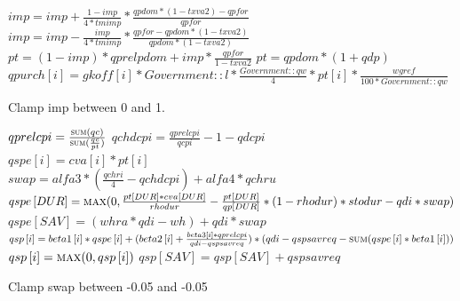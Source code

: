 \documentclass{article}
\begin{document}
\begin{algorithm}[H]
\caption{Market Confront}
    \begin{algorithmic}
        \State \(imp = imp + \frac{1 - imp}{4 * tmimp} * \frac{qpdom * (1 - txva2) - qpfor}{qpfor}\)
                \Else
        \State \(imp = imp - \frac{imp}{4 * tmimp} * \frac{qpfor - qpdom * (1 - txva2)}{qpdom * (1 - txva2)}\)
        \EndIf
        \State \(pt = (1 - imp) * qprelpdom + imp * \frac{qpfor}{1 - txva2}\)
        \EndFor
        \State \(pt = qpdom * (1 + qdp)\)
        \EndFor
        \State \(qpurch\left[i\right] = gkoff\left[i\right] * Government::l * \frac{Government::qw}{4} * pt\left[i\right] * \frac{wgref}{100 * Government::qw}\)
        \EndFor
        \\
        \State {}
        \State {}
        \State {}
        \EndFor
        \EndIf
        \EndFor
        \EndFunction
    \end{algorithmic}
    \small Clamp imp between 0 and 1.
\end{algorithm}

\begin{algorithm}[!htbp]
\caption{Compute Expenditures}
    \begin{algorithmic}
        \State \(qprelcpi = \frac{\Call{sum}{qc}}{\Call{sum}{\frac{qc}{pt}}}\)
        \State \(qchdcpi = \frac{qprelcpi}{qcpi} - 1 - qdcpi\)
        \\
        \State \(qspe\left[i\right] = cva\left[i\right] * pt\left[i\right]\)
        \EndIf
        \EndFor
        \\
        \State \(swap = alfa3 * (\frac{qchri}{4} - qchdcpi) + alfa4 * qchru\)
        \State \(qspe\left[DUR\right] = \Call{max}{0, \frac{pt\left[DUR\right] * cva\left[DUR\right]}{rhodur} - \frac{pt\left[DUR\right]}{qp\left[DUR\right]} * (1 - rhodur) * stodur - qdi * swap}\)
        \State \(qspe\left[SAV\right] = (whra * qdi - wh) + qdi * swap\)
        \\
        \State \(qsp\left[i\right] = beta1\left[i\right] * qspe\left[i\right] + (beta2\left[i\right] + \frac{beta3\left[i\right] * qprelcpi}{qdi - qspsavreq}) * (qdi - qspsavreq - \Call{sum}{qspe\left[i\right] * beta1\left[i\right]})\)
        \State \(qsp\left[i\right] = \Call{max}{0, qsp\left[i\right]}\)
        \EndIf
        \EndFor
        \State \(qsp\left[SAV\right] = qsp\left[SAV\right] + qspsavreq\)
        \EndFunction
    \end{algorithmic}
    \small Clamp swap between -0.05 and -0.05
\end{algorithm}
\end{document}
